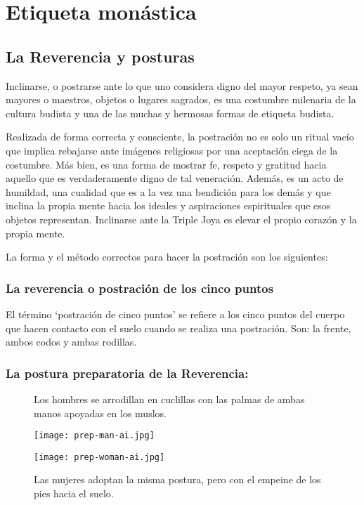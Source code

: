 \chapter{Etiqueta monástica}
\label{etiquette}

\section{La Reverencia y posturas}

Inclinarse, o postrarse ante lo que uno considera digno del mayor respeto, ya sean mayores o maestros, objetos o lugares sagrados, es una costumbre milenaria de la cultura budista y una de las muchas y hermosas formas de etiqueta budista.

Realizada de forma correcta y consciente, la postración no es solo un ritual vacío que implica rebajarse ante imágenes religiosas por una aceptación ciega de la costumbre. Más bien, es una forma de mostrar fe, respeto y gratitud hacia aquello que es verdaderamente digno de tal veneración. Además, es un acto de humildad, una cualidad que es a la vez una bendición para los demás y que inclina la propia mente hacia los ideales y aspiraciones espirituales que esos objetos representan. Inclinarse ante la Triple Joya es elevar el propio corazón y la propia mente.

La forma y el método correctos para hacer la postración son los siguientes:

\subsection{La reverencia o postración de los cinco puntos}

El término ‘postración de cinco puntos' se refiere a los cinco puntos del cuerpo que hacen contacto con el suelo cuando se realiza una postración. Son: la frente, ambos codos y ambas rodillas.

\captionsetup{font=small, labelformat=empty, position=above}

\subsection{La postura preparatoria de la Reverencia:}

\begin{figure}[h]
	\centering
	
	\begin{minipage}{0.40\textwidth}
		\centering
		\caption{Los hombres se arrodillan en cuclillas con las palmas de ambas manos apoyadas en los muslos.}
		\texttt{[image: prep-man-ai.jpg]}
		
	\end{minipage}
	\hfill
	\begin{minipage}{0.40\textwidth}
		\centering
		\caption{Las mujeres adoptan la misma postura, pero con el empeine de los pies hacia el suelo.}
		\texttt{[image: prep-woman-ai.jpg]}
		
	\end{minipage}
	
\end{figure}


